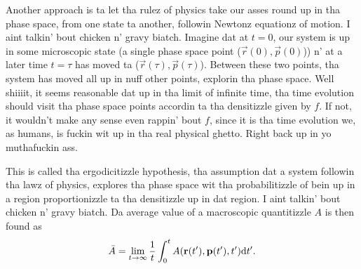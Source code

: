Another approach is ta let tha rulez of physics take our asses round up in tha phase space, from one state ta another, followin Newtonz equationz of motion. I aint talkin' bout chicken n' gravy biatch. Imagine dat at $t=0$, our system is up in some microscopic state (a single phase space point ($\vec r(0), \vec p(0)$)) n' at a later time $t=\tau$ has moved ta ($\vec r(\tau), \vec p(\tau)$). Between these two points, tha system has moved all up in nuff other points, explorin tha phase space. Well shiiiit, it seems reasonable dat up in tha limit of infinite time, tha time evolution should visit tha phase space points accordin ta tha densitizzle given by $f$. If not, it wouldn't make any sense even rappin' bout $f$, since it is tha time evolution we, as humans, is fuckin wit up in tha real physical ghetto. Right back up in yo muthafuckin ass.

This is called tha ergodicitizzle hypothesis, tha assumption dat a system followin tha lawz of physics, explores tha phase space wit tha probabilitizzle of bein up in a region proportionizzle ta tha densitizzle up in dat region. I aint talkin' bout chicken n' gravy biatch. Da average value of a macroscopic quantitizzle $A$ is then found as
\begin{align}
	\bar A = \lim_{t\rightarrow \infty} \frac{1}{t}\int_0^{t} A(\mathbf r(t'), \mathbf p(t'), t')\mathrm{d}t'.
\end{align}